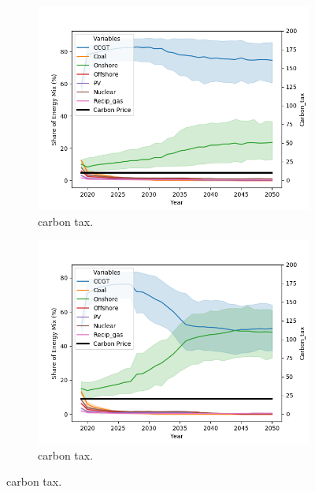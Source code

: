 \begin{figure}[h!]
	\centering
	\begin{subfigure}[b]{0.475\textwidth}
		\centering
		\includegraphics[width=\textwidth]{figures/scenarios/demand099-carbon10-datetime.png}
		\caption[Network2]%
		{{\small {} carbon tax.}}    
		\label{fig:demand99carbon10}
	\end{subfigure}
	\hfill
	\begin{subfigure}[b]{0.475\textwidth}  
		\centering 
		\includegraphics[width=\textwidth]{figures/scenarios/demand099-carbon20-datetime.png}
		\caption[]%
		{{ carbon tax.}}    
		\label{fig:demand99carbon20}
	\end{subfigure}

\end{figure}
